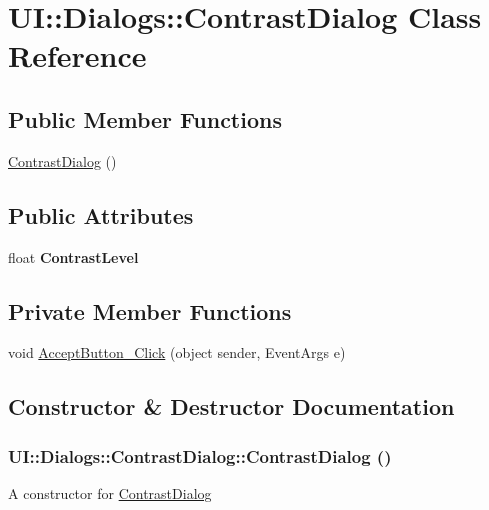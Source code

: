 \hypertarget{class_u_i_1_1_dialogs_1_1_contrast_dialog}{
\section{UI::Dialogs::ContrastDialog Class Reference}
\label{class_u_i_1_1_dialogs_1_1_contrast_dialog}
}
\subsection*{Public Member Functions}
\begin{DoxyCompactItemize}
\item 
\hyperlink{class_u_i_1_1_dialogs_1_1_contrast_dialog_a132eec552bc31b9d0824812157ac314e}{ContrastDialog} ()
\end{DoxyCompactItemize}
\subsection*{Public Attributes}
\begin{DoxyCompactItemize}
\item 
\hypertarget{class_u_i_1_1_dialogs_1_1_contrast_dialog_afb9f579b72aad49311a387e4cf73f573}{
float {\bfseries ContrastLevel}}
\label{class_u_i_1_1_dialogs_1_1_contrast_dialog_afb9f579b72aad49311a387e4cf73f573}

\end{DoxyCompactItemize}
\subsection*{Private Member Functions}
\begin{DoxyCompactItemize}
\item 
void \hyperlink{class_u_i_1_1_dialogs_1_1_contrast_dialog_a09bc379f0949d32c392a26672150246d}{AcceptButton\_\-Click} (object sender, EventArgs e)
\end{DoxyCompactItemize}


\subsection{Constructor \& Destructor Documentation}
\hypertarget{class_u_i_1_1_dialogs_1_1_contrast_dialog_a132eec552bc31b9d0824812157ac314e}{
\subsubsection[{ContrastDialog}]{\setlength{\rightskip}{0pt plus 5cm}UI::Dialogs::ContrastDialog::ContrastDialog ()}}
\label{class_u_i_1_1_dialogs_1_1_contrast_dialog_a132eec552bc31b9d0824812157ac314e}
A constructor for \hyperlink{class_u_i_1_1_dialogs_1_1_contrast_dialog}{ContrastDialog} 

